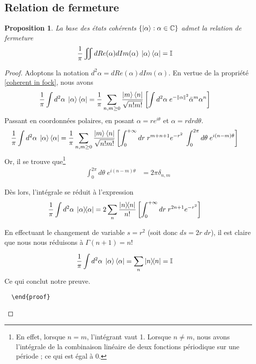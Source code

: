 \documentclass[11pt,oneside,a4paper]{article}
\newtheorem{property}[theorem]{Proposition}
\begin{document}
\subsection{Relation de fermeture}
\begin{property}
  La base des états cohérents $\left\{\ket{\alpha} : \alpha\in\mathbb{C}\right\}$ admet la relation de fermeture
  \begin{align}
    \frac{1}{\pi}\iint dRe(\alpha)dIm(\alpha) \; \ket{\alpha}\bra{\alpha} &= \mathbb{I}
  \end{align}
\end{property}
\begin{proof}
  Adoptons la notation $d^2\alpha = dRe(\alpha)dIm(\alpha)$. En vertue de la propriété \ref{coherent in fock}, nous avons
  \begin{align}
    \frac{1}{\pi}\int d^2\alpha \; \ket{\alpha}\bra{\alpha} &= \frac{1}{\pi}\sum_{n,m\geq 0} \frac{\ket{m}\bra{n}}{\sqrt{n!m!}} \left[\int d^2\alpha \; e^{-\norm{\alpha}^{2}} \bar{\alpha}^m\alpha^n\right]
  \end{align}
  Passant en coordonnées polaires, en posant $\alpha=re^{i\theta}$ et $\alpha = rdrd\theta$.
  \begin{align}
    \frac{1}{\pi}\int d^2\alpha \; \ket{\alpha}\bra{\alpha} &= \frac{1}{\pi}\sum_{n,m\geq 0}\frac{\ket{m}\bra{n}}{\sqrt{n!m!}}\left[\int_0^{+\infty}dr\; r^{m+n+1}e^{-r^2} \; \int_0^{2\pi}d\theta \; e^{i\left(n-m\right)\theta}\right]
  \end{align}
  Or, il se trouve que\footnote{En effet, lorsque $n=m$, l'intégrant vaut 1. Lorsque $n\neq m$, nous avons l'intégrale de la combinaison linéaire de deux fonctions périodique sur une période ; ce qui est égal à 0.}
  \begin{align}
    \int_0^{2\pi}d\theta \; e^{i\left(n-m\right)\theta} &= 2\pi\delta_{n,m}
  \end{align}

Dès lors, l'intégrale se réduit à l'expression
\begin{align}
  \frac{1}{\pi}\int d^2\alpha \; \ketbra{\alpha} &= 2\sum_n \frac{\ketbra{n}}{n!}\left[\int_0^{+\infty}dr \; r^{2n+1}e^{-r^2} \right]
\end{align}

En effectuant le changement de variable $s = r^2$ (soit donc $ds = 2r \; dr$), il est claire que nous nous réduisons à $\Gamma(n+1) = n!$

\begin{align}
  \frac{1}{\pi}\int d^2\alpha \; \ket{\alpha}\bra{\alpha} &= \sum_n \ketbra{n} = \mathbb{I}
\end{align}
Ce qui conclut notre preuve.
\begin{verbatim}
  \end{proof}
\end{verbatim}
\end{proof}
\end{document}
